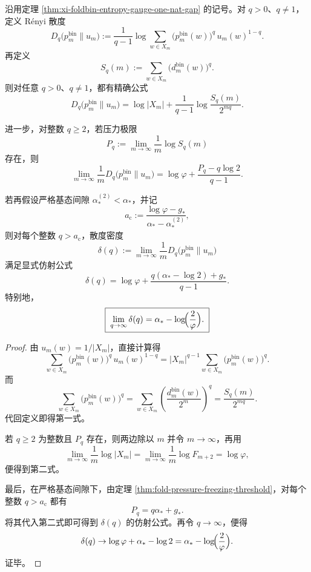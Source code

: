 \begin{theorem}\label{thm:xi-foldbin-renyi-divergence-freezing-affine}
沿用定理 \ref{thm:xi-foldbin-entropy-gauge-one-nat-gap} 的记号。对 \(q>0\)、\(q\neq 1\)，定义 Rényi 散度
\[
D_q\!\bigl(p_m^{\mathrm{bin}}\|u_m\bigr)
:=
\frac{1}{q-1}\log\sum_{w\in X_m}
\bigl(p_m^{\mathrm{bin}}(w)\bigr)^q\,u_m(w)^{1-q}.
\]
再定义
\[
S_q(m):=\sum_{w\in X_m}\bigl(d_m^{\mathrm{bin}}(w)\bigr)^q.
\]
则对任意 \(q>0\)、\(q\neq 1\)，都有精确公式
\[
\boxed{\;
D_q\!\bigl(p_m^{\mathrm{bin}}\|u_m\bigr)
=
\log|X_m|+\frac{1}{q-1}\log\frac{S_q(m)}{2^{mq}}.\;}
\]

进一步，对整数 \(q\ge 2\)，若压力极限
\[
P_q:=\lim_{m\to\infty}\frac{1}{m}\log S_q(m)
\]
存在，则
\[
\boxed{\;
\lim_{m\to\infty}\frac{1}{m}
D_q\!\bigl(p_m^{\mathrm{bin}}\|u_m\bigr)
=
\log\varphi+\frac{P_q-q\log 2}{q-1}.\;}
\]

若再假设严格基态间隙 \(\alpha_*^{(2)}<\alpha_*\)，并记
\[
a_{\mathrm c}:=\frac{\log\varphi-g_*}{\alpha_*-\alpha_*^{(2)}},
\]
则对每个整数 \(q>a_{\mathrm c}\)，散度密度
\[
\delta(q):=
\lim_{m\to\infty}\frac{1}{m}
D_q\!\bigl(p_m^{\mathrm{bin}}\|u_m\bigr)
\]
满足显式仿射公式
\[
\boxed{\;
\delta(q)
=
\log\varphi+\frac{q(\alpha_*-\log 2)+g_*}{q-1}.\;}
\]
特别地，
\[
\boxed{\;
\lim_{q\to\infty}\delta(q)=\alpha_*-\log\!\Bigl(\frac{2}{\varphi}\Bigr).\;}
\]
\end{theorem}
\begin{proof}
由 \(u_m(w)=1/|X_m|\)，直接计算得
\[
\sum_{w\in X_m}
\bigl(p_m^{\mathrm{bin}}(w)\bigr)^q\,u_m(w)^{1-q}
=
|X_m|^{q-1}\sum_{w\in X_m}\bigl(p_m^{\mathrm{bin}}(w)\bigr)^q.
\]
而
\[
\sum_{w\in X_m}\bigl(p_m^{\mathrm{bin}}(w)\bigr)^q
=
\sum_{w\in X_m}\left(\frac{d_m^{\mathrm{bin}}(w)}{2^m}\right)^q
=
\frac{S_q(m)}{2^{mq}}.
\]
代回定义即得第一式。

若 \(q\ge 2\) 为整数且 \(P_q\) 存在，则两边除以 \(m\) 并令 \(m\to\infty\)，再用
\[
\lim_{m\to\infty}\frac{1}{m}\log|X_m|
=
\lim_{m\to\infty}\frac{1}{m}\log F_{m+2}
=
\log\varphi,
\]
便得到第二式。

最后，在严格基态间隙下，由定理 \ref{thm:fold-pressure-freezing-threshold}，对每个整数 \(q>a_{\mathrm c}\) 都有
\[
P_q=q\alpha_*+g_*.
\]
将其代入第二式即可得到 \(\delta(q)\) 的仿射公式。再令 \(q\to\infty\)，便得
\[
\delta(q)\to \log\varphi+\alpha_*-\log 2
=
\alpha_*-\log\!\Bigl(\frac{2}{\varphi}\Bigr).
\]
证毕。
\end{proof}

